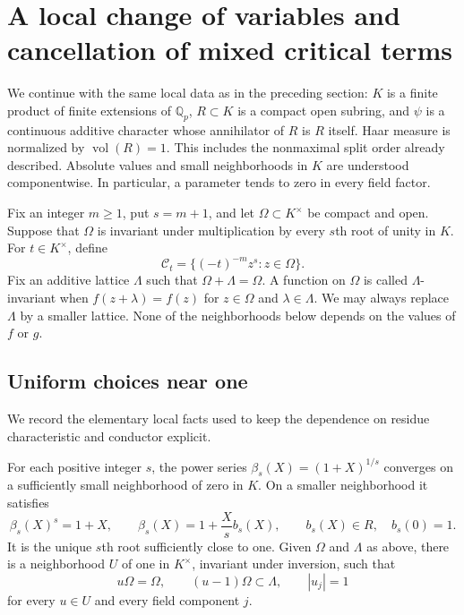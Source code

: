 \section{A local change of variables and cancellation of mixed critical terms}
\label{sec:theta-orbital-identity}

We continue with the same local data as in the preceding section:
$K$ is a finite product of finite extensions of $\mathbb Q_p$,
$R\subset K$ is a compact open subring, and $\psi$ is a continuous
additive character whose annihilator of $R$ is $R$ itself.  Haar
measure is normalized by $\operatorname{vol}(R)=1$.  This includes
the nonmaximal split order already described.  Absolute values and
small neighborhoods in $K$ are understood componentwise.  In
particular, a parameter tends to zero in every field factor.

Fix an integer $m\ge1$, put $s=m+1$, and let $\Omega\subset K^\times$
be compact and open.  Suppose that $\Omega$ is invariant under
multiplication by every $s$th root of unity in $K$.
For $t\in K^\times$, define
\begin{equation}\label{orb-cut}
 \mathcal C_t=\{(-t)^{-m}z^s:z\in\Omega\}.
\end{equation}
Fix an additive lattice $\Lambda$ such that
$\Omega+\Lambda=\Omega$.  A function on $\Omega$ is called
$\Lambda$-invariant when $f(z+\lambda)=f(z)$ for
$z\in\Omega$ and $\lambda\in\Lambda$.
We may always replace $\Lambda$ by a smaller lattice.  None of the
neighborhoods below depends on the values of $f$ or $g$.

\subsection{Uniform choices near one}

We record the elementary local facts used to keep the dependence on
residue characteristic and conductor explicit.

\begin{lemma}\label{orb-near-one}
For each positive integer $s$, the power series
$\beta_s(X)=(1+X)^{1/s}$ converges on a sufficiently small
neighborhood of zero in $K$.  On a smaller neighborhood it satisfies
\[
 \beta_s(X)^s=1+X,\qquad
 \beta_s(X)=1+\frac{X}{s}b_s(X),\qquad b_s(X)\in R,
 \quad b_s(0)=1.
\]
It is the unique $s$th root sufficiently close to one.
Given $\Omega$ and $\Lambda$ as above, there is a neighborhood
$U$ of one in $K^\times$, invariant under inversion, such that
\[
 u\Omega=\Omega,\qquad (u-1)\Omega\subset\Lambda,
 \qquad |u_j|=1
\]
for every $u\in U$ and every field component $j$.
\end{lemma}

